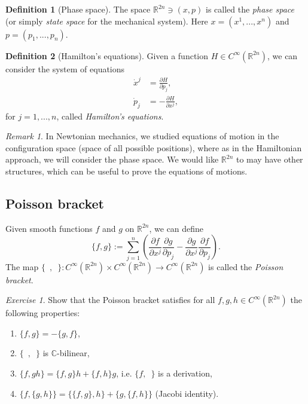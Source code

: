 \documentclass[11pt]{amsart}
\numberwithin{equation}{section}
\theoremstyle{plain}
\theoremstyle{definition}
\newtheorem{defn}{Definition}[subsection]
\theoremstyle{remark}
\newtheorem{rem}{Remark}[subsection]
\newtheorem{exe}{Exercise}[subsection]
\newcommand{\R}{\mathbb{R}}
\begin{document}
\begin{defn}[Phase space]
The space $\R^{2n}\ni (x,p)$ is called the \emph{phase space} (or simply \emph{state space} for the mechanical system). Here $x=(x^1,...,x^n)$ and $p=(p_1,...,p_n)$.
\end{defn}

\begin{defn}[Hamilton's equations]
Given a function $H\in C^\infty(\R^{2n})$, we can consider the system of equations 
\begin{align}
\dot{x}^j&=\frac{\partial H}{\partial p_j},\\
\dot{p}_j&=-\frac{\partial H}{\partial x^j},
\end{align}
for $j=1,...,n$, called \emph{Hamilton's equations}.
\end{defn}

\begin{rem}
In Newtonian mechanics, we studied equations of motion in the configuration space (space of all possible positions), where as in the Hamiltonian approach, we will consider the phase space. We would like $\R^{2n}$ to may have other structures, which can be useful to prove the equations of motions.
\end{rem}

\subsection{Poisson bracket}

Given smooth functions $f$ and $g$ on $\R^{2n}$, we can define 
\begin{equation}
\label{Poisson_bracket}
\{f,g\}:=\sum_{j=1}^n\left(\frac{\partial f}{\partial x^j}\frac{\partial g}{\partial p_j}-\frac{\partial g}{\partial x^j}\frac{\partial f}{\partial p_j}\right).
\end{equation}
The map $\{\enspace,\enspace\}\colon C^\infty(\R^{2n})\times C^\infty(\R^{2n})\to C^\infty(\R^{2n})$ is called the \emph{Poisson bracket}.  

\begin{exe}
Show that the Poisson bracket satisfies for all $f,g,h\in C^\infty(\R^{2n})$ the following properties:
\begin{enumerate}[$(i)$]
\item{$\{f,g\}=-\{g,f\}$,
}
\item{$\{\enspace,\enspace\}$ is $\mathbb{C}$-bilinear,
}
\item{$\{f,gh\}=\{f,g\}h+\{f,h\}g$, i.e. $\{f,\enspace\}$ is a derivation,
}
\item{$\{f,\{g,h\}\}=\{\{f,g\},h\}+\{g,\{f,h\}\}$ (Jacobi identity).
}
\end{enumerate}
\end{exe}
\end{document}
